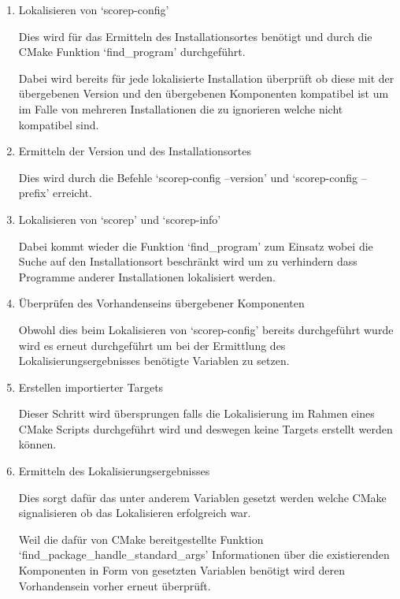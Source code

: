 \documentclass[german,proseminar,hyperref,utf8]{zihpub}
\begin{document}
    \begin{enumerate}
        \item Lokalisieren von `scorep-config'

        Dies wird für das Ermitteln des Installationsortes benötigt und durch die CMake Funktion
        `find\_program' durchgeführt.

        Dabei wird bereits für jede lokalisierte Installation überprüft ob diese mit der übergebenen
        Version und den übergebenen Komponenten kompatibel ist um im Falle von mehreren Installationen
        die zu ignorieren welche nicht kompatibel sind.

        \item Ermitteln der Version und des Installationsortes

        Dies wird durch die Befehle `scorep-config --version' und `scorep-config --prefix' erreicht.

        \item Lokalisieren von `scorep' und `scorep-info'

        Dabei kommt wieder die Funktion `find\_program' zum Einsatz wobei die Suche auf den Installationsort
        beschränkt wird um zu verhindern dass Programme anderer Installationen lokalisiert werden.

        \item Überprüfen des Vorhandenseins übergebener Komponenten

        Obwohl dies beim Lokalisieren von `scorep-config' bereits durchgeführt wurde wird es erneut
        durchgeführt um bei der Ermittlung des Lokalisierungsergebnisses benötigte Variablen zu setzen.

        \item Erstellen importierter Targets

        Dieser Schritt wird übersprungen falls die Lokalisierung im Rahmen eines CMake Scripts
        durchgeführt wird und deswegen keine Targets erstellt werden können.

        \item Ermitteln des Lokalisierungsergebnisses

        Dies sorgt dafür das unter anderem Variablen gesetzt werden welche CMake signalisieren ob das
        Lokalisieren erfolgreich war.

        Weil die dafür von CMake bereitgestellte Funktion `find\_package\_handle\_standard\_args' Informationen
        über die existierenden Komponenten in Form von gesetzten Variablen benötigt wird deren
        Vorhandensein vorher erneut überprüft.
    \end{enumerate}
    
\end{document}
